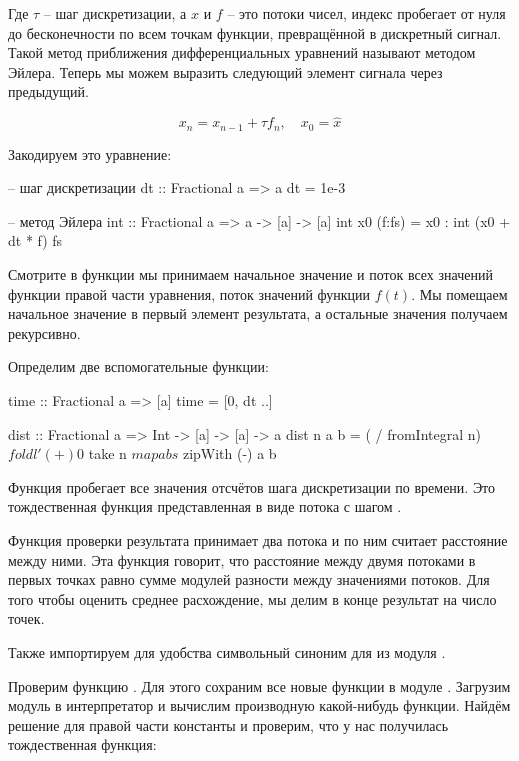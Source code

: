 Где $\tau$ -- шаг дискретизации, а $x$  и $f$ -- это потоки
чисел, индекс  пробегает от нуля до бесконечности по 
всем точкам функции, превращённой в дискретный сигнал. 
Такой метод приближения дифференциальных уравнений называют
методом Эйлера. 
Теперь мы можем выразить следующий элемент сигнала через
предыдущий. 

\[ x_n = x_{n-1} + \tau f_n, \quad x_0 = \hat{x} \]

Закодируем это уравнение:

\begin{code}
-- шаг дискретизации
dt :: Fractional a => a
dt = 1e-3

-- метод Эйлера
int :: Fractional a => a -> [a] -> [a]
int x0 (f:fs) = x0 : int (x0 + dt * f) fs
\end{code}

Смотрите в функции  мы принимаем начальное 
значение  и поток всех значений функции правой
части уравнения, поток значений функции $f(t)$. 
Мы помещаем начальное значение в первый элемент результата,
а остальные значения получаем рекурсивно. 

Определим две вспомогательные функции:

\begin{code}
time :: Fractional a => [a]
time = [0, dt ..]

dist :: Fractional a => Int -> [a] -> [a] -> a
dist n a b = ( / fromIntegral n) $ 
    foldl' (+) 0 $ take n $ map abs $ zipWith (-) a b
\end{code}

Функция  пробегает все значения отсчётов шага дискретизации
по времени. Это тождественная функция представленная в виде
потока с шагом .

Функция проверки результата  принимает
два потока и по ним считает расстояние между ними.
Эта функция говорит, что расстояние между двумя
потоками в  первых точках равно сумме
модулей разности между значениями потоков.
Для того чтобы оценить среднее расхождение, мы делим
в конце результат на число точек.

Также импортируем для удобства символьный синоним
для  из модуля .


Проверим функцию . Для этого сохраним все новые
функции в модуле . Загрузим модуль в интерпретатор и 
вычислим производную какой-нибудь функции. Найдём решение 
для правой части константы и проверим, что у нас получилась
тождественная функция:

